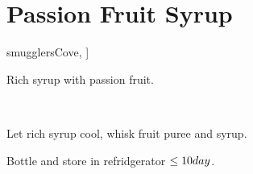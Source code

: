 \section{Passion Fruit Syrup}


\begin{recipestats}[
	servings=3~$C$,
	preptime=10~\minute,
	original=\citeauthor{smugglersCove}~\cite[p.~325]{smugglersCove},
]
\end{recipestats}

\begin{recipeabstract}
	Rich syrup with passion fruit.
\end{recipeabstract}


\begin{ingredientcolumns}[1]
	\begin{ingredientblock}
		\\
	\end{ingredientblock}
\end{ingredientcolumns}


\begin{preparation}
	\item Let rich syrup cool, whisk fruit puree and syrup.
	\item Bottle and store in refridgerator $\le 10 day$.
\end{preparation}


\recipeend%
